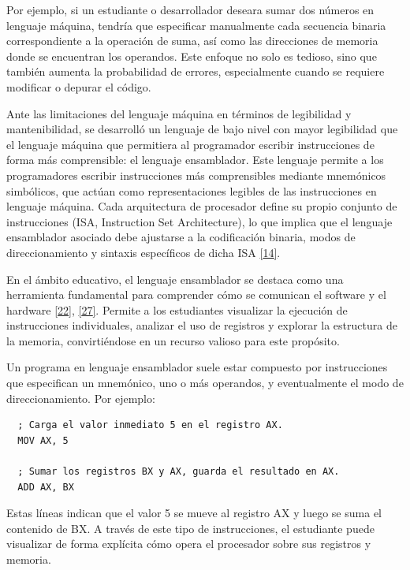 \documentclass[12pt,oneside]{templates/unerthesis}
\begin{document}
Por ejemplo, si un estudiante o desarrollador deseara sumar dos números en lenguaje máquina, tendría que especificar manualmente cada secuencia binaria correspondiente a la operación de suma, así como las direcciones de memoria donde se encuentran los operandos. Este enfoque no solo es tedioso, sino que también aumenta la probabilidad de errores, especialmente cuando se requiere modificar o depurar el código.

Ante las limitaciones del lenguaje máquina en términos de legibilidad y mantenibilidad, se desarrolló un lenguaje de bajo nivel con mayor legibilidad que el lenguaje máquina que permitiera al programador escribir instrucciones de forma más comprensible: el lenguaje ensamblador. Este lenguaje permite a los programadores escribir instrucciones más comprensibles mediante mnemónicos simbólicos, que actúan como representaciones legibles de las instrucciones en lenguaje máquina. Cada arquitectura de procesador define su propio conjunto de instrucciones (ISA, Instruction Set Architecture), lo que implica que el lenguaje ensamblador asociado debe ajustarse a la codificación binaria, modos de direccionamiento y sintaxis específicos de dicha ISA \protect\hyperlink{ref-stallings_computer_2021}{{[}14{]}}.

En el ámbito educativo, el lenguaje ensamblador se destaca como una herramienta fundamental para comprender cómo se comunican el software y el hardware \protect\hyperlink{ref-tanenbaum_structured_2016}{{[}22{]}}, \protect\hyperlink{ref-null_essentials_2023}{{[}27{]}}. Permite a los estudiantes visualizar la ejecución de instrucciones individuales, analizar el uso de registros y explorar la estructura de la memoria, convirtiéndose en un recurso valioso para este propósito.

Un programa en lenguaje ensamblador suele estar compuesto por instrucciones que especifican un mnemónico, uno o más operandos, y eventualmente el modo de direccionamiento. Por ejemplo:

\begin{lstlisting}
  ; Carga el valor inmediato 5 en el registro AX.
  MOV AX, 5  

  ; Sumar los registros BX y AX, guarda el resultado en AX.
  ADD AX, BX 
  \end{lstlisting}

Estas líneas indican que el valor 5 se mueve al registro AX y luego se suma el contenido de BX. A través de este tipo de instrucciones, el estudiante puede visualizar de forma explícita cómo opera el procesador sobre sus registros y memoria.
\end{document}
